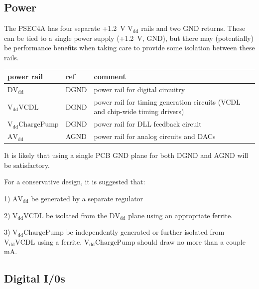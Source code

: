 \documentclass[12pt]{article}
\begin{document}
\subsection*{Power}
The PSEC4A has four separate +1.2~V $\mathrm{V_{dd}}$ rails and two GND returns.
These can be tied to a single power supply (+1.2~V, GND), but there may (potentially) be
performance benefits when taking care to provide some isolation between these rails. 

\begin{center}
\begin{tabular}[h!]{l|l|p{10cm}}
  \hline
   power rail       & ref &  comment \\ \hline \hline
   $\mathrm{DV_{dd}}$ &  DGND  &  power rail for digital circuitry  \\ \hline
   $\mathrm{V_{dd}VCDL}$ &  DGND  &  power rail for timing generation circuits (VCDL and chip-wide timing drivers) \\ \hline
   $\mathrm{V_{dd}ChargePump}$ &  DGND  &  power rail for DLL feedback circuit \\ \hline
   $\mathrm{AV_{dd}}$ &  AGND  &  power rail for analog circuits and DACs \\ \hline

\end{tabular}
\end{center}

It is likely that using a single PCB GND plane for both DGND and AGND will be satisfactory.

For a conservative design, it is suggested that: 

1) $\mathrm{AV_{dd}}$ be generated by a separate regulator

2) $\mathrm{V_{dd}VCDL}$ be isolated from the $\mathrm{DV_{dd}}$ plane using an appropriate ferrite.

3) $\mathrm{V_{dd}ChargePump}$ be independently generated or further isolated from  $\mathrm{V_{dd}VCDL}$ using a ferrite.
$\mathrm{V_{dd}ChargePump}$ should draw no more than a couple mA.

\subsection*{Digital I/0s}
\end{document}
